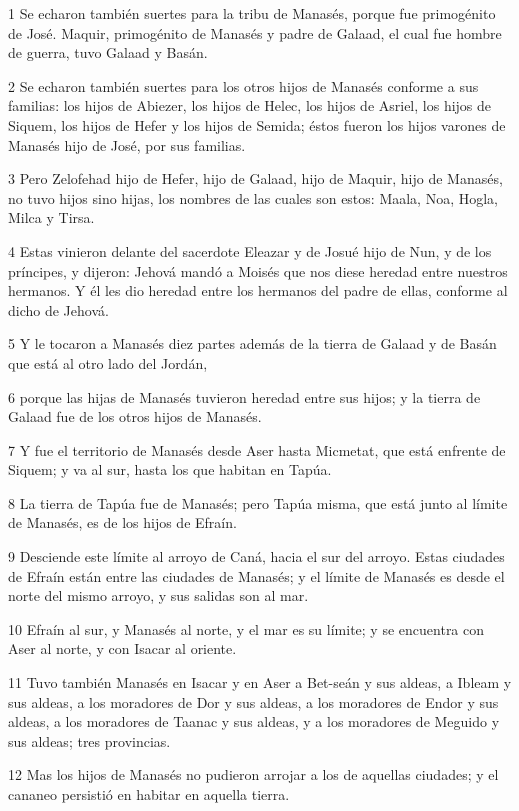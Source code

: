 \par 1 Se echaron también suertes para la tribu de Manasés, porque fue primogénito de José. Maquir, primogénito de Manasés y padre de Galaad, el cual fue hombre de guerra, tuvo Galaad y Basán.
\par 2 Se echaron también suertes para los otros hijos de Manasés conforme a sus familias: los hijos de Abiezer, los hijos de Helec, los hijos de Asriel, los hijos de Siquem, los hijos de Hefer y los hijos de Semida; éstos fueron los hijos varones de Manasés hijo de José, por sus familias.
\par 3 Pero Zelofehad hijo de Hefer, hijo de Galaad, hijo de Maquir, hijo de Manasés, no tuvo hijos sino hijas, los nombres de las cuales son estos: Maala, Noa, Hogla, Milca y Tirsa.
\par 4 Estas vinieron delante del sacerdote Eleazar y de Josué hijo de Nun, y de los príncipes, y dijeron: Jehová mandó a Moisés que nos diese heredad entre nuestros hermanos. Y él les dio heredad entre los hermanos del padre de ellas, conforme al dicho de Jehová.
\par 5 Y le tocaron a Manasés diez partes además de la tierra de Galaad y de Basán que está al otro lado del Jordán,
\par 6 porque las hijas de Manasés tuvieron heredad entre sus hijos; y la tierra de Galaad fue de los otros hijos de Manasés.
\par 7 Y fue el territorio de Manasés desde Aser hasta Micmetat, que está enfrente de Siquem; y va al sur, hasta los que habitan en Tapúa.
\par 8 La tierra de Tapúa fue de Manasés; pero Tapúa misma, que está junto al límite de Manasés, es de los hijos de Efraín.
\par 9 Desciende este límite al arroyo de Caná, hacia el sur del arroyo. Estas ciudades de Efraín están entre las ciudades de Manasés; y el límite de Manasés es desde el norte del mismo arroyo, y sus salidas son al mar.
\par 10 Efraín al sur, y Manasés al norte, y el mar es su límite; y se encuentra con Aser al norte, y con Isacar al oriente.
\par 11 Tuvo también Manasés en Isacar y en Aser a Bet-seán y sus aldeas, a Ibleam y sus aldeas, a los moradores de Dor y sus aldeas, a los moradores de Endor y sus aldeas, a los moradores de Taanac y sus aldeas, y a los moradores de Meguido y sus aldeas; tres provincias.
\par 12 Mas los hijos de Manasés no pudieron arrojar a los de aquellas ciudades; y el cananeo persistió en habitar en aquella tierra.

